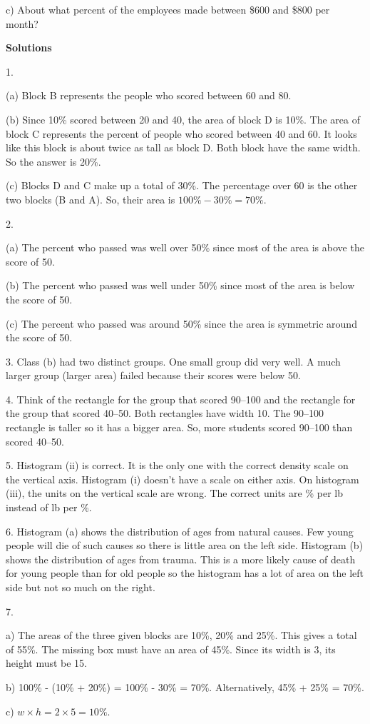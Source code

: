 \documentclass[10pt]{article}
\begin{document}
\hspace{10pt} c) About what percent of the employees made between \$600 and
\$800 per month?
\vfill
\eject

\begin{center}
\textbf{\large Solutions}
\end{center}
\bigskip

1.

(a) Block B represents the people who scored between 60 and 80.

(b) Since 10\% scored between 20 and 40, the area of block D is 10\%.  
The area of block C represents the percent of people who scored between 40 and 60.
It looks like this block is about twice as tall as block D.  Both block have the 
same width.  So the answer is 20\%.

(c) Blocks D and C make up a total of 30\%.  The percentage over 60 is the other two blocks (B and A).
So, their area is $100\% - 30\% = 70\%$.
\bigskip

2.

(a) The percent who passed was well over 50\% since most of the area is above the score of 50.

(b) The percent who passed was well under 50\% since most of the area is below 
the score of 50.

(c) The percent who passed was around 50\% since the area is symmetric around 
the score of 50.
\bigskip

3. Class (b) had two distinct groups.  One small group did very well.  
A much larger group (larger area)
failed because their scores were below 50.
\bigskip

4. Think of the rectangle for the group that scored 90--100 and the rectangle for the group that scored 40--50.
Both rectangles have width 10.  The 90--100 rectangle is taller so it has a bigger area.  So, more students
scored 90--100 than scored 40--50.
\bigskip

5. Histogram (ii) is correct.  It is the only one with the correct density scale on the vertical axis.
Histogram (i) doesn't have a scale on either axis.  On histogram (iii), the units on the vertical
scale are wrong.  The correct units are \% per lb  instead of lb per \%.
\bigskip

6.
Histogram (a) shows the distribution of ages from natural causes. Few young people will die of such causes
so there is little area on the left side. Histogram (b) shows the distribution of ages from trauma. This is a
more likely cause of death for young people than for old people so the histogram has a lot of area on the
left side but not so much on the right.
\bigskip

7. 

a) The areas of the three given blocks are 10\%, 20\% and 25\%.  This gives a 
total of 55\%.  The missing box must have an area of  45\%.  Since its width
is 3, its height must be 15.  

b) 100\% - (10\% + 20\%) = 100\% - 30\% = 70\%.  Alternatively, 45\% + 25\% = 70\%.

c)  $w\times h = 2\times 5 = 10\%$.
\vfill
\eject
\end{document}
